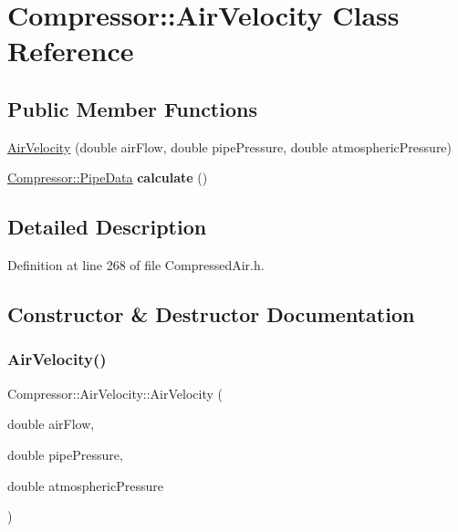 \hypertarget{class_compressor_1_1_air_velocity}{}\section{Compressor\+:\+:Air\+Velocity Class Reference}
\label{class_compressor_1_1_air_velocity}
\subsection*{Public Member Functions}
\begin{DoxyCompactItemize}
\item 
\hyperlink{class_compressor_1_1_air_velocity_a53449e5354b1e33db644078ce4d92e4b}{Air\+Velocity} (double air\+Flow, double pipe\+Pressure, double atmospheric\+Pressure)
\item 
\mbox{\label{class_compressor_1_1_air_velocity_af17f62700c50a692b4a0db98a11c880c}} 
\hyperlink{struct_compressor_1_1_pipe_data}{Compressor\+::\+Pipe\+Data} {\bfseries calculate} ()
\end{DoxyCompactItemize}


\subsection{Detailed Description}


Definition at line 268 of file Compressed\+Air.\+h.



\subsection{Constructor \& Destructor Documentation}
\mbox{\label{class_compressor_1_1_air_velocity_a53449e5354b1e33db644078ce4d92e4b}} 
\subsubsection{\texorpdfstring{Air\+Velocity()}{AirVelocity()}}
{\footnotesize\ttfamily Compressor\+::\+Air\+Velocity\+::\+Air\+Velocity (\begin{DoxyParamCaption}\item[{double}]{air\+Flow,  }\item[{double}]{pipe\+Pressure,  }\item[{double}]{atmospheric\+Pressure }\end{DoxyParamCaption})}

